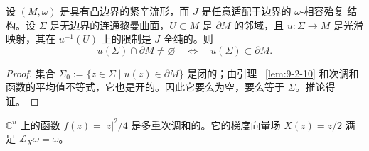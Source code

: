 \begin{corollary}\label{cor:9-2-11}
设 $(M,\omega)$ 是具有凸边界的紧辛流形，而 $J$ 是任意适配于边界的 $\omega$-相容殆复
结构。设 $\Sigma$ 是无边界的连通黎曼曲面，$U\subset M$ 是 $\partial M$ 的邻域，且
$u:\Sigma\to M$ 是光滑映射，其在 $u^{-1}(U)$ 上的限制是 $J$-全纯的。则
\[
  u(\Sigma)\cap\partial M\ne\varnothing
  \quad\Longleftrightarrow\quad
  u(\Sigma)\subset\partial M.
\]
\end{corollary}

\begin{proof}
集合 $\Sigma_0:=\{z\in\Sigma\mid u(z)\in\partial M\}$ 是闭的；由引理
~\ref{lem:9-2-10} 和次调和函数的平均值不等式，它也是开的。因此它要么为空，要么等于
$\Sigma$。推论得证。
\end{proof}

\begin{example}\label{ex:9-2-12}
$\mathbb C^n$ 上的函数 $f(z)=|z|^2/4$ 是多重次调和的。它的梯度向量场
$X(z)=z/2$ 满足 $\mathcal L_X\omega=\omega$。
\end{example}

